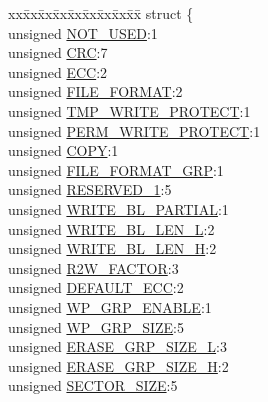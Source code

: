 \begin{DoxyCompactItemize}
\begin{tabbing}
\end{tabbing}\item 
\begin{tabbing}
xx\=xx\=xx\=xx\=xx\=xx\=xx\=xx\=xx\=\kill
struct \{\\
\>unsigned \hyperlink{union_c_s_d_a75098a81c518e187eb7a43cc63ad1a9e}{NOT\_USED}:1\\
\>unsigned \hyperlink{union_c_s_d_ab9e9fe7c42064ff2fcd04adcda3a6919}{CRC}:7\\
\>unsigned \hyperlink{union_c_s_d_a0b66060063e348ad0cf4a49d2380f1df}{ECC}:2\\
\>unsigned \hyperlink{union_c_s_d_a4d5c9caba6937b22fc28097555b0d5f7}{FILE\_FORMAT}:2\\
\>unsigned \hyperlink{union_c_s_d_ad993e84c7363e572015ecd4febd287ae}{TMP\_WRITE\_PROTECT}:1\\
\>unsigned \hyperlink{union_c_s_d_a3a2187b7b6f177b49edd72b3b7029a82}{PERM\_WRITE\_PROTECT}:1\\
\>unsigned \hyperlink{union_c_s_d_a2317c39e8e0a74a691775ca01c3b6292}{COPY}:1\\
\>unsigned \hyperlink{union_c_s_d_a2cc5d30eb399d2bb76b00f60b9e58d3c}{FILE\_FORMAT\_GRP}:1\\
\>unsigned \hyperlink{union_c_s_d_a4b738029ab14d09fb361dad2e4994434}{RESERVED\_1}:5\\
\>unsigned \hyperlink{union_c_s_d_a43b1868270aabc9a86957afb7e6284e6}{WRITE\_BL\_PARTIAL}:1\\
\>unsigned \hyperlink{union_c_s_d_af3021e3510ae4d7c6bb67db7631e618c}{WRITE\_BL\_LEN\_L}:2\\
\>unsigned \hyperlink{union_c_s_d_acd5655503cdf3ba80f9110d578225598}{WRITE\_BL\_LEN\_H}:2\\
\>unsigned \hyperlink{union_c_s_d_ae394f1cc9aa14ae785fa8e495d4e09e7}{R2W\_FACTOR}:3\\
\>unsigned \hyperlink{union_c_s_d_ab976dfdd761cebbdfdb770291fc8ea01}{DEFAULT\_ECC}:2\\
\>unsigned \hyperlink{union_c_s_d_a54e1bd0baf661cae3d264544133247d0}{WP\_GRP\_ENABLE}:1\\
\>unsigned \hyperlink{union_c_s_d_a8d25931881f80fde567fa09a97865f65}{WP\_GRP\_SIZE}:5\\
\>unsigned \hyperlink{union_c_s_d_ae06e0a15e6038bcc05b8819004f17bde}{ERASE\_GRP\_SIZE\_L}:3\\
\>unsigned \hyperlink{union_c_s_d_ade2242b8fbe922df9894d9cbd9e2d147}{ERASE\_GRP\_SIZE\_H}:2\\
\>unsigned \hyperlink{union_c_s_d_ad535ba65f4b82820b6b600ef822e69f3}{SECTOR\_SIZE}:5\\

\end{tabbing}
\end{DoxyCompactItemize}
